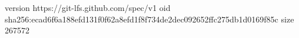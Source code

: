 version https://git-lfs.github.com/spec/v1
oid sha256:ecad6f6a188efd131f0f62a8efd1f8f734de2dec092652ffc275db1d0169f85c
size 267572
